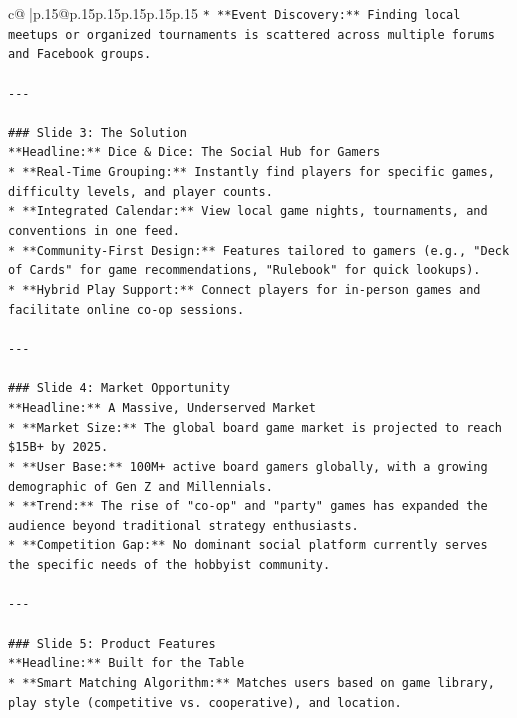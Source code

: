 \documentclass{article}
\begin{document}
{\begin{supertabular}{c@{$\;$}|p{.15\linewidth}@{}p{.15\linewidth}p{.15\linewidth}p{.15\linewidth}p{.15\linewidth}p{.15\linewidth}}
{{{\texttt{*   **Event Discovery:** Finding local meetups or organized tournaments is scattered across multiple forums and Facebook groups.} \\
\\ 
\texttt{{-}{-}{-}} \\
\\ 
\texttt{\#\#\# Slide 3: The Solution} \\
\texttt{**Headline:** Dice \& Dice: The Social Hub for Gamers} \\
\texttt{*   **Real{-}Time Grouping:** Instantly find players for specific games, difficulty levels, and player counts.} \\
\texttt{*   **Integrated Calendar:** View local game nights, tournaments, and conventions in one feed.} \\
\texttt{*   **Community{-}First Design:** Features tailored to gamers (e.g., "Deck of Cards" for game recommendations, "Rulebook" for quick lookups).} \\
\texttt{*   **Hybrid Play Support:** Connect players for in{-}person games and facilitate online co{-}op sessions.} \\
\\ 
\texttt{{-}{-}{-}} \\
\\ 
\texttt{\#\#\# Slide 4: Market Opportunity} \\
\texttt{**Headline:** A Massive, Underserved Market} \\
\texttt{*   **Market Size:** The global board game market is projected to reach \$15B+ by 2025.} \\
\texttt{*   **User Base:** 100M+ active board gamers globally, with a growing demographic of Gen Z and Millennials.} \\
\texttt{*   **Trend:** The rise of "co{-}op" and "party" games has expanded the audience beyond traditional strategy enthusiasts.} \\
\texttt{*   **Competition Gap:** No dominant social platform currently serves the specific needs of the hobbyist community.} \\
\\ 
\texttt{{-}{-}{-}} \\
\\ 
\texttt{\#\#\# Slide 5: Product Features} \\
\texttt{**Headline:** Built for the Table} \\
\texttt{*   **Smart Matching Algorithm:** Matches users based on game library, play style (competitive vs. cooperative), and location.} \\
}}}
\end{supertabular}}
\end{document}
